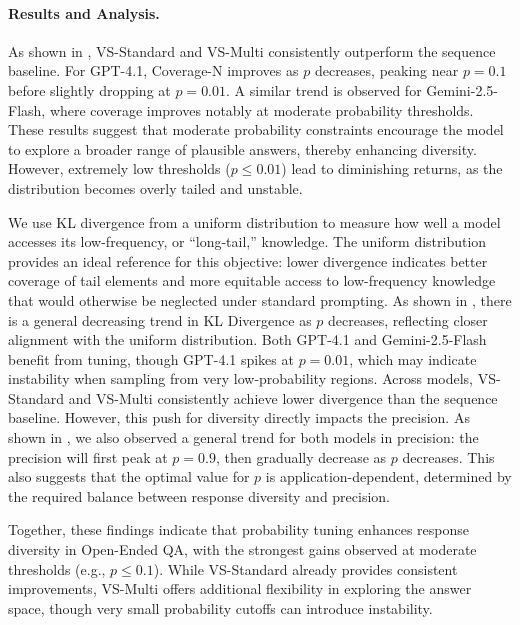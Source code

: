 \paragraph{Results and Analysis.} As shown in , VS-Standard and VS-Multi consistently outperform the sequence baseline. For GPT-4.1, Coverage-N improves as $p$ decreases, peaking near $p=0.1$ before slightly dropping at $p=0.01$. A similar trend is observed for Gemini-2.5-Flash, where coverage improves notably at moderate probability thresholds. These results suggest that moderate probability constraints encourage the model to explore a broader range of plausible answers, thereby enhancing diversity. However, extremely low thresholds ($p \leq 0.01$) lead to diminishing returns, as the distribution becomes overly tailed and unstable.


We use KL divergence from a uniform distribution to measure how well a model accesses its low-frequency, or ``long-tail,'' knowledge. 
The uniform distribution provides an ideal reference for this objective: lower divergence indicates better coverage of tail elements and more equitable access to low-frequency knowledge that would otherwise be neglected under standard prompting.
As shown in , there is a general decreasing trend in KL Divergence as $p$ decreases, reflecting closer alignment with the uniform distribution.
Both GPT-4.1 and Gemini-2.5-Flash benefit from tuning, though GPT-4.1 spikes at $p=0.01$, which may indicate instability when sampling from very low-probability regions. Across models, VS-Standard and VS-Multi consistently achieve lower divergence than the sequence baseline.
However, this push for diversity directly impacts the precision.
As shown in , we also observed a general trend for both models in precision: the precision will first peak at $p=0.9$, then gradually decrease as $p$ decreases. 
This also suggests that the optimal value for $p$ is application-dependent, determined by the required balance between response diversity and precision.

Together, these findings indicate that probability tuning enhances response diversity in Open-Ended QA, with the strongest gains observed at moderate thresholds (e.g., $p \leq 0.1$). While VS-Standard already provides consistent improvements, VS-Multi offers additional flexibility in exploring the answer space, though very small probability cutoffs can introduce instability.

